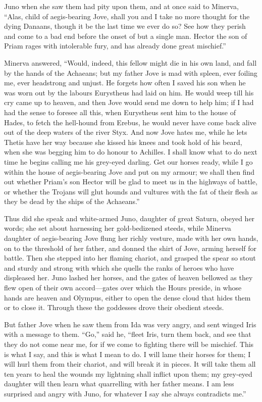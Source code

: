 Juno when she saw them had pity upon them, and at once said to Minerva,
“Alas, child of aegis-bearing Jove, shall you and I take no more thought
for the dying Danaans, though it be the last time we ever do so? See how
they perish and come to a bad end before the onset of but a single man.
Hector the son of Priam rages with intolerable fury, and has already done
great mischief.”

Minerva answered, “Would, indeed, this fellow might die in his own land,
and fall by the hands of the Achaeans; but my father Jove is mad with
spleen, ever foiling me, ever headstrong and unjust. He forgets how often
I saved his son when he was worn out by the labours Eurystheus had laid on
him. He would weep till his cry came up to heaven, and then Jove would
send me down to help him; if I had had the sense to foresee all this, when
Eurystheus sent him to the house of Hades, to fetch the hell-hound from
Erebus, he would never have come back alive out of the deep waters of the
river Styx. And now Jove hates me, while he lets Thetis have her way
because she kissed his knees and took hold of his beard, when she was
begging him to do honour to Achilles. I shall know what to do next time he
begins calling me his grey-eyed darling. Get our horses ready, while I go
within the house of aegis-bearing Jove and put on my armour; we shall then
find out whether Priam’s son Hector will be glad to meet us in the
highways of battle, or whether the Trojans will glut hounds and vultures
with the fat of their flesh as they be dead by the ships of the Achaeans.”

Thus did she speak and white-armed Juno, daughter of great Saturn, obeyed
her words; she set about harnessing her gold-bedizened steeds, while
Minerva daughter of aegis-bearing Jove flung her richly vesture, made with
her own hands, on to the threshold of her father, and donned the shirt of
Jove, arming herself for battle. Then she stepped into her flaming
chariot, and grasped the spear so stout and sturdy and strong with which
she quells the ranks of heroes who have displeased her. Juno lashed her
horses, and the gates of heaven bellowed as they flew open of their own
accord—gates over which the Hours preside, in whose hands are heaven
and Olympus, either to open the dense cloud that hides them or to close
it. Through these the goddesses drove their obedient steeds.

But father Jove when he saw them from Ida was very angry, and sent winged
Iris with a message to them. “Go,” said he, “fleet Iris, turn them back,
and see that they do not come near me, for if we come to fighting there
will be mischief. This is what I say, and this is what I mean to do. I
will lame their horses for them; I will hurl them from their chariot, and
will break it in pieces. It will take them all ten years to heal the
wounds my lightning shall inflict upon them; my grey-eyed daughter will
then learn what quarrelling with her father means. I am less surprised and
angry with Juno, for whatever I say she always contradicts me.”

